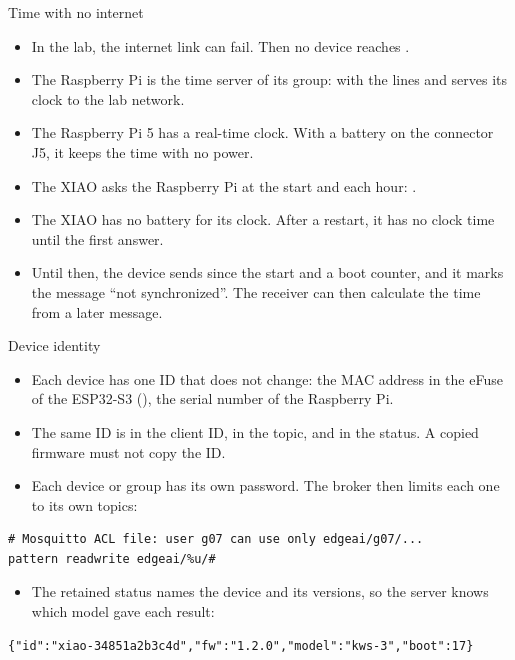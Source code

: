 \begin{frame}{Time with no internet}
  \small
  \begin{itemize}
    \item In the lab, the internet link can fail. Then no device reaches
          .
    \item The Raspberry Pi is the time server of its group: 
          with the lines  and
           serves its clock to the lab network.
    \item The Raspberry Pi 5 has a real-time clock. With a battery on the
          connector J5, it keeps the time with no power.
    \item The XIAO asks the Raspberry Pi at the start and each hour:
          .
    \item The XIAO has no battery for its clock. After a restart, it has no
          clock time until the first answer.
    \item Until then, the device sends  since the start and a boot
          counter, and it marks the message ``not synchronized''. The
          receiver can then calculate the time from a later message.
  \end{itemize}
\end{frame}

\begin{frame}[fragile]{Device identity}
  \small
  \begin{itemize}
    \item Each device has one ID that does not change: the MAC address in
          the eFuse of the ESP32-S3 (), the serial
          number of the Raspberry Pi.
    \item The same ID is in the client ID, in the topic, and in the status.
          A copied firmware must not copy the ID.
    \item Each device or group has its own password. The broker then limits
          each one to its own topics:
  \end{itemize}
\begin{lstlisting}[style=shell]
# Mosquitto ACL file: user g07 can use only edgeai/g07/...
pattern readwrite edgeai/%u/#
\end{lstlisting}
  \begin{itemize}
    \item The retained status names the device and its versions, so the
          server knows which model gave each result:
  \end{itemize}
\begin{lstlisting}[style=python]
{"id":"xiao-34851a2b3c4d","fw":"1.2.0","model":"kws-3","boot":17}
\end{lstlisting}
\end{frame}

